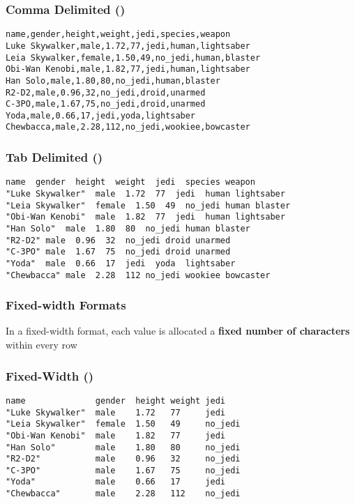 \documentclass[12pt]{beamer}\usepackage[]{graphicx}\usepackage[]{color}
\begin{document}

\begin{frame}[fragile]
\frametitle{Comma Delimited ()}

{\small
\begin{verbatim}
name,gender,height,weight,jedi,species,weapon
Luke Skywalker,male,1.72,77,jedi,human,lightsaber
Leia Skywalker,female,1.50,49,no_jedi,human,blaster
Obi-Wan Kenobi,male,1.82,77,jedi,human,lightsaber
Han Solo,male,1.80,80,no_jedi,human,blaster
R2-D2,male,0.96,32,no_jedi,droid,unarmed
C-3PO,male,1.67,75,no_jedi,droid,unarmed
Yoda,male,0.66,17,jedi,yoda,lightsaber
Chewbacca,male,2.28,112,no_jedi,wookiee,bowcaster
\end{verbatim}
}

\end{frame}


\begin{frame}[fragile]
\frametitle{Tab Delimited ()}

{\small
\begin{verbatim}
name  gender  height  weight  jedi  species weapon
"Luke Skywalker"  male  1.72  77  jedi  human lightsaber
"Leia Skywalker"  female  1.50  49  no_jedi human blaster
"Obi-Wan Kenobi"  male  1.82  77  jedi  human lightsaber
"Han Solo"  male  1.80  80  no_jedi human blaster
"R2-D2" male  0.96  32  no_jedi droid unarmed
"C-3PO" male  1.67  75  no_jedi droid unarmed
"Yoda"  male  0.66  17  jedi  yoda  lightsaber
"Chewbacca" male  2.28  112 no_jedi wookiee bowcaster
\end{verbatim}
}

\end{frame}


\begin{frame}
\frametitle{Fixed-width Formats}

\bbi
  \item In a fixed-width format, each value is allocated a \textbf{fixed number of characters} within every row
\ei

\end{frame}


\begin{frame}[fragile]
\frametitle{Fixed-Width ()}

{\small
\begin{verbatim}
name              gender  height weight jedi  
"Luke Skywalker"  male    1.72   77     jedi   
"Leia Skywalker"  female  1.50   49     no_jedi
"Obi-Wan Kenobi"  male    1.82   77     jedi  
"Han Solo"        male    1.80   80     no_jedi
"R2-D2"           male    0.96   32     no_jedi
"C-3PO"           male    1.67   75     no_jedi
"Yoda"            male    0.66   17     jedi
"Chewbacca"       male    2.28   112    no_jedi
\end{verbatim}
}

\end{frame}
\end{document}
